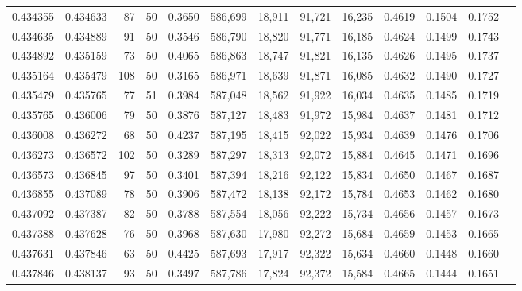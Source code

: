 \begin{tabular}{rrrrrrrrrrrrr}
0.434355 & 0.434633 &    87 &  50 &                                     0.3650 & 586,699 &  18,911 &  91,721 &  16,235 & 0.4619 & 0.1504 & 0.1752 \\
0.434635 & 0.434889 &    91 &  50 &                                     0.3546 & 586,790 &  18,820 &  91,771 &  16,185 & 0.4624 & 0.1499 & 0.1743 \\
0.434892 & 0.435159 &    73 &  50 &                                     0.4065 & 586,863 &  18,747 &  91,821 &  16,135 & 0.4626 & 0.1495 & 0.1737 \\
0.435164 & 0.435479 &   108 &  50 &                                     0.3165 & 586,971 &  18,639 &  91,871 &  16,085 & 0.4632 & 0.1490 & 0.1727 \\
0.435479 & 0.435765 &    77 &  51 &                                     0.3984 & 587,048 &  18,562 &  91,922 &  16,034 & 0.4635 & 0.1485 & 0.1719 \\
0.435765 & 0.436006 &    79 &  50 &                                     0.3876 & 587,127 &  18,483 &  91,972 &  15,984 & 0.4637 & 0.1481 & 0.1712 \\
0.436008 & 0.436272 &    68 &  50 &                                     0.4237 & 587,195 &  18,415 &  92,022 &  15,934 & 0.4639 & 0.1476 & 0.1706 \\
0.436273 & 0.436572 &   102 &  50 &                                     0.3289 & 587,297 &  18,313 &  92,072 &  15,884 & 0.4645 & 0.1471 & 0.1696 \\
0.436573 & 0.436845 &    97 &  50 &                                     0.3401 & 587,394 &  18,216 &  92,122 &  15,834 & 0.4650 & 0.1467 & 0.1687 \\
0.436855 & 0.437089 &    78 &  50 &                                     0.3906 & 587,472 &  18,138 &  92,172 &  15,784 & 0.4653 & 0.1462 & 0.1680 \\
0.437092 & 0.437387 &    82 &  50 &                                     0.3788 & 587,554 &  18,056 &  92,222 &  15,734 & 0.4656 & 0.1457 & 0.1673 \\
0.437388 & 0.437628 &    76 &  50 &                                     0.3968 & 587,630 &  17,980 &  92,272 &  15,684 & 0.4659 & 0.1453 & 0.1665 \\
0.437631 & 0.437846 &    63 &  50 &                                     0.4425 & 587,693 &  17,917 &  92,322 &  15,634 & 0.4660 & 0.1448 & 0.1660 \\
0.437846 & 0.438137 &    93 &  50 &                                     0.3497 & 587,786 &  17,824 &  92,372 &  15,584 & 0.4665 & 0.1444 & 0.1651 \\

\end{tabular}
